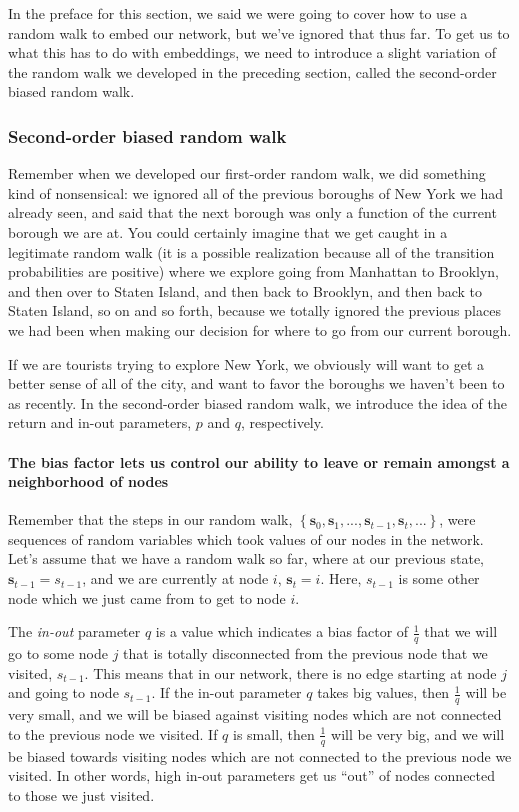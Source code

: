 In the preface for this section, we said we were going to cover how to use a random walk to embed our network, but we've ignored that thus far. To get us to what this has to do with embeddings, we need to introduce a slight variation of the random walk we developed in the preceding section, called the second-order biased random walk.
\subsubsection*{Second-order biased random walk}

Remember when we developed our first-order random walk, we did something kind of nonsensical: we ignored all of the previous boroughs of New York we had already seen, and said that the next borough was only a function of the current borough we are at. You could certainly imagine that we get caught in a legitimate random walk (it is a possible realization because all of the transition probabilities are positive) where we explore going from Manhattan to Brooklyn, and then over to Staten Island, and then back to Brooklyn, and then back to Staten Island, so on and so forth, because we totally ignored the previous places we had been when making our decision for where to go from our current borough. 

If we are tourists trying to explore New York, we obviously will want to get a better sense of all of the city, and want to favor the boroughs we haven't been to as recently. In the second-order biased random walk, we introduce the idea of the return and in-out parameters, $p$ and $q$, respectively. 

\paragraph*{The bias factor lets us control our ability to leave or remain amongst a neighborhood of nodes}

Remember that the steps in our random walk, $\left\{\mathbf s_0, \mathbf s_1, ..., \mathbf s_{t-1}, \mathbf s_t, ...\right\}$, were sequences of random variables which took values of our nodes in the network. Let's assume that we have a random walk so far, where at our previous state, $\mathbf s_{t-1} = s_{t-1}$, and we are currently at node $i$, $\mathbf s_t = i$. Here, $s_{t-1}$ is some other node which we just came from to get to node $i$.

The \textit{in-out} parameter $q$ is a value which indicates a bias factor of $\frac{1}{q}$ that we will go to some node $j$ that is totally disconnected from the previous node that we visited, $s_{t-1}$. This means that in our network, there is no edge starting at node $j$ and going to node $s_{t-1}$. If the in-out parameter $q$ takes big values, then $\frac{1}{q}$ will be very small, and we will be biased against visiting nodes which are not connected to the previous node we visited. If $q$ is small, then $\frac{1}{q}$ will be very big, and we will be biased towards visiting nodes which are not connected to the previous node we visited. In other words, high in-out parameters get us ``out'' of nodes connected to those we just visited.

